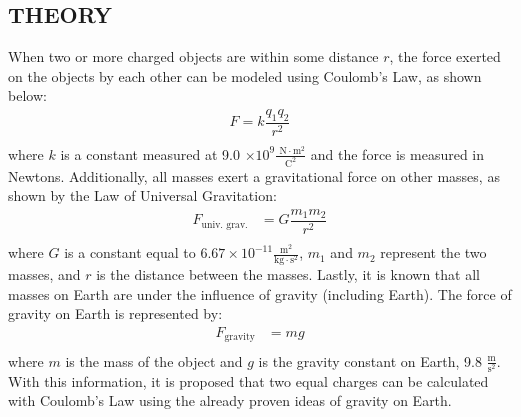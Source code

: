 \documentclass [12pt, letterpaper, twoside] {article}
\begin{document}
\subsection* {THEORY}
When two or more charged objects are within some distance \(r\), the force exerted on the objects by each other can be modeled using Coulomb's Law, as shown below:
\begin {equation}
  \begin {split}
    F = k\dfrac{q_{1}q_{2}}{r^2} \\
  \end {split}
\end {equation}
where \(k\) is a constant measured at 9.0 \(\times 10^9 \tfrac{\text{ N}\cdot\text{m}^2}{\text{C}^2}\) and the force is measured in Newtons. Additionally, all masses exert a gravitational force on other masses, as shown by the Law of Universal Gravitation:
\begin {equation}
  \begin {split}
    F_{\text{univ. grav.}} &= G\dfrac{m_{1}m_{2}}{r^2} \\
  \end {split}
\end {equation}
where \(G\) is a constant equal to \(6.67\times{10^{-11}}\tfrac{\text{m}^2}{\text{kg}\cdot{\text{s}^2}}\), \(m_{1}\) and \(m_{2}\) represent the two masses, and \(r\) is the distance between the masses. Lastly, it is known that all masses on Earth are under the influence of gravity (including Earth). The force of gravity on Earth is represented by:
\begin{equation}
  \begin{split}
    F_{\text{gravity}} &= mg \\
  \end{split}
\end{equation}
where \(m\) is the mass of the object and \(g\) is the gravity constant on Earth, 9.8 \(\tfrac{\text{m}}{\text{s}^2}\). With this information, it is proposed that two equal charges can be calculated with Coulomb's Law using the already proven ideas of gravity on Earth.
\end{document}
